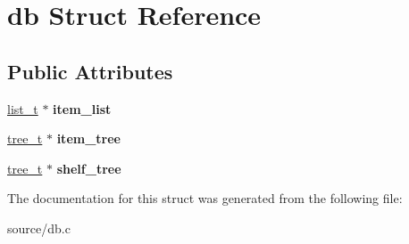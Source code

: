 \hypertarget{structdb}{}\section{db Struct Reference}
\label{structdb}
\subsection*{Public Attributes}
\begin{DoxyCompactItemize}
\item 
\hyperlink{list_8h_a15376354e4e8b4f1732e9df17f30786c}{list\+\_\+t} $\ast$ {\bfseries item\+\_\+list}\hypertarget{structdb_af44ec53e9e0dea9d2a4abb9e5c831a35}{}\label{structdb_af44ec53e9e0dea9d2a4abb9e5c831a35}

\item 
\hyperlink{tree_8h_aabd08cfd7893b1b0d401ce689de8c1b7}{tree\+\_\+t} $\ast$ {\bfseries item\+\_\+tree}\hypertarget{structdb_a4ae9935eb7c41e09765abad7250691d4}{}\label{structdb_a4ae9935eb7c41e09765abad7250691d4}

\item 
\hyperlink{tree_8h_aabd08cfd7893b1b0d401ce689de8c1b7}{tree\+\_\+t} $\ast$ {\bfseries shelf\+\_\+tree}\hypertarget{structdb_a2a005c034a0365b2203fb33c51660ebd}{}\label{structdb_a2a005c034a0365b2203fb33c51660ebd}

\end{DoxyCompactItemize}


The documentation for this struct was generated from the following file\+:\begin{DoxyCompactItemize}
\item 
source/db.\+c\end{DoxyCompactItemize}
